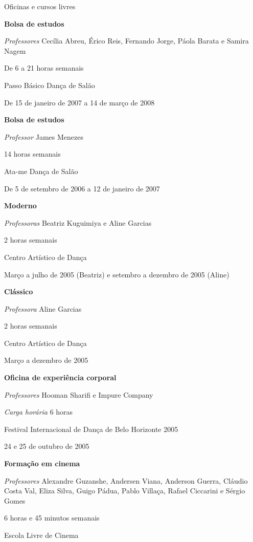 \begin {rubric} {Oficinas e cursos livres}


\entry* [Salão]
\textbf {Bolsa de estudos}

\textit {Professores} Cecília Abreu, Érico Reis, Fernando Jorge, Páola Barata e Samira Nagem

De 6 a 21 horas semanais

Passo Básico Dança de Salão

De 15 de janeiro de 2007 a 14 de março de 2008

\entry*
\textbf {Bolsa de estudos}

\textit {Professor} James Menezes

14 horas semanais

Ata-me Dança de Salão

De 5 de setembro de 2006 a 12 de janeiro de 2007

\entry* [Balé]
\textbf {Moderno}

\textit {Professoras} Beatriz Kuguimiya e Aline Garcias

2 horas semanais

Centro Artístico de Dança

Março a julho de 2005 (Beatriz) e setembro a dezembro de 2005 (Aline)

\entry*
\textbf {Clássico}

\textit {Professora} Aline Garcias

2 horas semanais

Centro Artístico de Dança

Março a dezembro de 2005

\entry* [Contemporânea]
\textbf {Oficina de experiência corporal}

\textit {Professores} Hooman Sharifi e Impure Company

\textit {Carga horária} 6 horas

Festival Internacional de Dança de Belo Horizonte 2005

24 e 25 de outubro de 2005

\entry*
\textbf {Formação em cinema}

\textit {Professores} Alexandre Guzanshe, Andersen Viana, Anderson Guerra, Cláudio Costa Val, Eliza Silva, Guigo Pádua, Pablo Villaça, Rafael Ciccarini e Sérgio Gomes

6 horas e 45 minutos semanais

Escola Livre de Cinema


\end{rubric}
